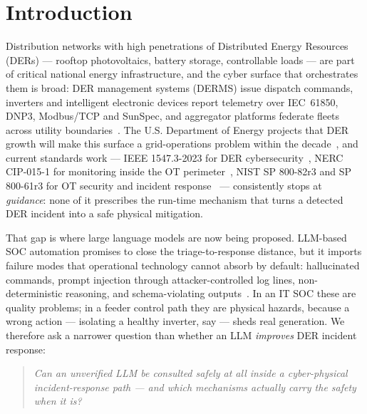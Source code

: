 \section{Introduction}
\label{sec:intro}

Distribution networks with high penetrations of Distributed Energy
Resources (DERs) --- rooftop photovoltaics, battery storage, controllable
loads --- are part of critical national energy infrastructure, and the
cyber surface that orchestrates them is broad: DER management systems
(DERMS) issue dispatch commands, inverters and intelligent electronic
devices report telemetry over IEC~61850, DNP3, Modbus/TCP and SunSpec, and
aggregator platforms federate fleets across utility
boundaries~\cite{CaballeroPena2022_DER_DN,Zografopoulos2023_DER_CybersecurityOutlook}.
The U.S. Department of Energy projects that DER growth will make this
surface a grid-operations problem within the
decade~\cite{DOE_CESER_DER2022}, and current standards work --- IEEE
1547.3-2023 for DER cybersecurity~\cite{IEEE15473_2023}, NERC CIP-015-1
for monitoring inside the OT perimeter~\cite{NERC_CIP015_2024}, NIST SP
800-82r3 and SP 800-61r3 for OT security and incident
response~\cite{NIST80082r3,NIST80061r3} --- consistently stops at
\emph{guidance}: none of it prescribes the run-time mechanism that turns a
detected DER incident into a safe physical mitigation.

That gap is where large language models are now being proposed. LLM-based
SOC automation promises to close the triage-to-response distance, but it
imports failure modes that operational technology cannot absorb by
default: hallucinated commands, prompt injection through
attacker-controlled log lines, non-deterministic reasoning, and
schema-violating outputs~\cite{Yao2024_LLM_SecPrivacy,MITRE_ATLAS}. In an
IT SOC these are quality problems; in a feeder control path they are
physical hazards, because a wrong action --- isolating a healthy inverter,
say --- sheds real generation. We therefore ask a narrower question than
whether an LLM \emph{improves} DER incident response:

\begin{quote}
\emph{Can an unverified LLM be consulted safely at all inside a
cyber-physical incident-response path --- and which mechanisms actually
carry the safety when it is?}
\end{quote}

